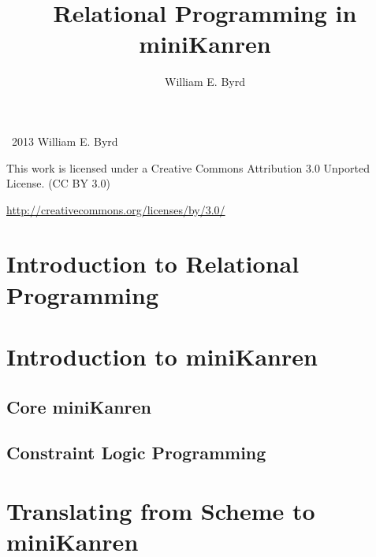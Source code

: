 \documentclass[onecolumn, 11pt, oneside, openright]{book}
\begin{document}
\begin{schemeregion}


\frontmatter

\VerbatimFootnotes

\title{\thesistitle{}}

\author{\thesisauthor{}}

\thispagestyle{empty}


\title{Relational Programming in miniKanren}
\author{William E. Byrd}
\maketitle

\newpage
\thispagestyle{empty}
\large
\noindent
\textcopyright~2013 William E. Byrd

\vspace{5mm}

\huge
\noindent
\ccLogo
\ccAttribution

\vspace{2mm}

\large
\noindent
This work is licensed under a Creative Commons Attribution 3.0 Unported License.
(CC BY 3.0)

\noindent
\url{http://creativecommons.org/licenses/by/3.0/}
\normalsize





{
\setcounter{tocdepth}{1}
\setlength{\parskip}{0pt}
\tableofcontents
}

\newpage

\mainmatter

\chapter{Introduction to Relational Programming}

\chapter{Introduction to miniKanren}
\section{Core miniKanren}
\section{Constraint Logic Programming}

\chapter{Translating from Scheme to miniKanren}

\end{schemeregion}
\end{document}
